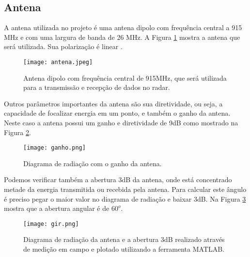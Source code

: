 \subsection{Antena}
A antena utilizada no projeto é uma antena dipolo com frequência central a 915 MHz e com uma largura de banda de 26 MHz. A Figura \ref{antena} mostra a antena que será utilizada. Sua polarização é linear \cite{balanis}.
\begin{figure}[H]
    \centering
   \texttt{[image: antena.jpeg]}
   \caption{Antena dipolo com frequência central de 915MHz, que será utilizada para a transmissão e recepção de dados no radar.}
   \label{antena}
    \end{figure}
Outros parâmetros importantes da antena são sua diretividade, ou seja, a capacidade de focalizar energia em um ponto, e também o ganho da antena. Neste caso a antena possui um ganho e diretividade de 9dB como mostrado na Figura \ref{ganho}.
\begin{figure}[H]
    \centering
   \texttt{[image: ganho.png]}
   \caption{Diagrama de radiação com o ganho da antena.}
   \label{ganho}
    \end{figure}
Podemos verificar também a abertura 3dB da antena, onde está concentrado metade da energia transmitida ou recebida pela antena.  Para calcular este ângulo é preciso pegar o maior valor no diagrama de radiação e baixar 3dB. Na Figura \ref{dr} mostra que a abertura angular é de $60^o$.
\begin{figure}[t]
    \centering
   \texttt{[image: gir.png]}
   \caption{Diagrama de radiação da antena e a abertura 3dB realizado através de medição em campo e plotado utilizando a ferramenta MATLAB.}
   \label{dr}
    \end{figure}
